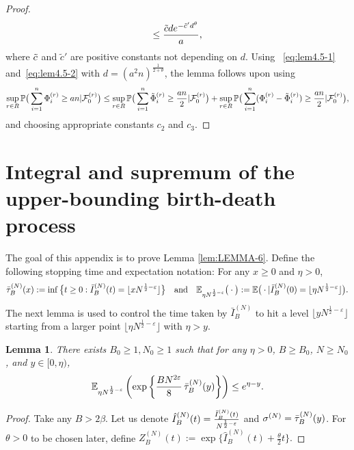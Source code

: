 \documentclass[11pt, reqno]{article}
\newtheorem{lemma}[theorem]{Lemma}
\numberwithin{equation}{section}
\numberwithin{theorem}{section}
\begin{document}
\begin{appendix}
\begin{proof}
\begin{equation}
    \leq \frac{\Tilde{c}d e^{-\Tilde{c}'d^{\theta}}}{a},
\end{equation}
where $\Tilde{c}$ and $\tilde{c}'$ are positive constants not depending on $d$. 
Using ~\eqref{eq:lem4.5-1} and~\eqref{eq:lem4.5-2} with $d=(a^2n)^{\frac{1}{2+\theta}}$, the lemma follows upon using
$$\sup_{r\in R}\mathbb{P}\big(\sum_{i=1}^{n}\Phi^{(r)}_i \geq an|\mathcal{F}^{(r)}_0\big)\leq \sup_{r\in R}\mathbb{P}\big(\sum_{i=1}^{n}\Tilde{\Phi}^{(r)}_i\geq \frac{an}{2}|\mathcal{F}^{(r)}_0\big)+\sup_{r\in R} \mathbb{P}\big(\sum_{i=1}^n (\Phi^{(r)}_i-\Tilde{\Phi}^{(r)}_i)\geq \frac{an}{2}|\mathcal{F}^{(r)}_0\big),$$
and choosing appropriate constants $c_2$ and $c_3$.
\end{proof}



\section{Integral and supremum of the upper-bounding birth-death process}
\label{sec:app-int-IB}
The goal of this appendix is to prove Lemma \ref{lem:LEMMA-6}.
Define the following stopping time and expectation notation: For any $x \ge 0$ and $\eta>0$,
$$\Bar{\tau}^{(N)}_B(x):=\inf \big\{t\geq 0:\Bar{I}^{(N)}_B(t)= \lfloor xN^{\frac{1}{2}-\varepsilon} \rfloor\big\}
\quad\text{and}\quad \mathbb{E}_{\eta N^{\frac{1}{2}-\varepsilon}}\big(\cdot\big) :=\mathbb{E}\big(\cdot|\bar{I}_B^{(N)}(0)=\lfloor \eta N^{\frac{1}{2}-\varepsilon} \rfloor\big).$$
The next lemma is used to control the time taken by $\bar{I}_B^{(N)}$ to hit a level $\lfloor yN^{\frac{1}{2}-\varepsilon} \rfloor$ starting from a larger point $\lfloor \eta N^{\frac{1}{2}-\varepsilon} \rfloor$ with $\eta> y$.
\begin{lemma} \label{lem:LEMMA-1}
There exists $B_0 \ge 1, N_0 \ge 1$ such that for any $\eta>0$, $B\geq B_0$, $N\geq N_0$, and $y\in[0,\eta)$,
$$\mathbb{E}_{\eta N^{\frac{1}{2}-\varepsilon}}\left(\exp\left\lbrace \frac{B N^{2\varepsilon}}{8}\, \Bar{\tau}^{(N)}_B(y)\right\rbrace\right)\leq e^{\eta-y}.$$
\end{lemma}
\begin{proof}
Take any $B > 2\beta$. Let us denote $\hat{I}^{(N)}_B(t)=\frac{\Bar{I}^{(N)}_B(t)}{N^{\frac{1}{2}-\varepsilon}}$ and $\sigma^{(N)}=\Bar{\tau}^{(N)}_B(y)$. 
For $\theta>0$ to be chosen later, define
$Z^{(N)}_B(t):=\exp\big\{\hat{I}^{(N)}_B(t)+\frac{\theta}{2}t\big\}.$

\end{proof}
\end{appendix}
\end{document}

